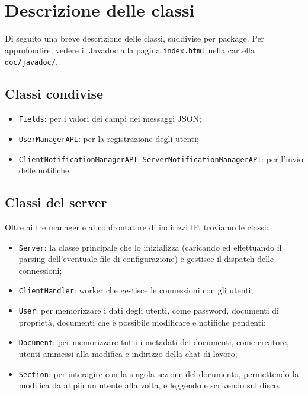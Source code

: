 \section{Descrizione delle classi}
Di seguito una breve descrizione delle classi, suddivise per package. Per approfondire, vedere il Javadoc alla pagina \texttt{index.html} nella cartella \texttt{doc/javadoc/}.

\subsection{Classi condivise}
\begin{itemize}
	\item \texttt{Fields}: per i valori dei campi dei messaggi JSON;
	\item \texttt{UserManagerAPI}: per la registrazione degli utenti;
	\item \texttt{ClientNotificationManagerAPI}, \texttt{ServerNotificationManagerAPI}: per l'invio delle notifiche.
\end{itemize}

\subsection{Classi del server}
Oltre ai tre manager e al confrontatore di indirizzi IP, troviamo le classi:
\begin{itemize}
	\item \texttt{Server}: la classe principale che lo inizializza (caricando ed effettuando il parsing dell'eventuale file di configurazione) e gestisce il dispatch delle connessioni;
	\item \texttt{ClientHandler}: worker che gestisce le connessioni con gli utenti;
	\item \texttt{User}: per memorizzare i dati degli utenti, come password, documenti di proprietà, documenti che è possibile modificare e notifiche pendenti;
	\item \texttt{Document}: per memorizzare tutti i metadati dei documenti, come creatore, utenti ammessi alla modifica e indirizzo della chat di lavoro;
	\item \texttt{Section}: per interagire con la singola sezione del documento, permettendo la modifica da al più un utente alla volta, e leggendo e scrivendo sul disco.
\end{itemize}

